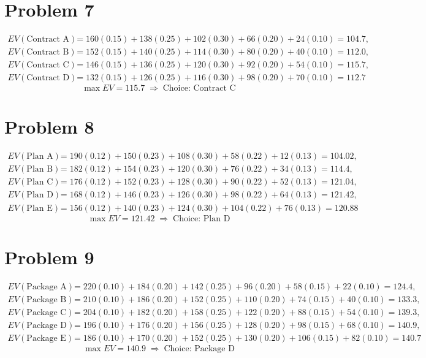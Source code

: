 	\section*{Problem 7}
	\[
	\begin{aligned}
	EV(\text{Contract A}) &= 160(0.15)+138(0.25)+102(0.30)+66(0.20)+24(0.10)=104.7,\\
	EV(\text{Contract B}) &= 152(0.15)+140(0.25)+114(0.30)+80(0.20)+40(0.10)=112.0,\\
	EV(\text{Contract C}) &= 146(0.15)+136(0.25)+120(0.30)+92(0.20)+54(0.10)=115.7,\\
	EV(\text{Contract D}) &= 132(0.15)+126(0.25)+116(0.30)+98(0.20)+70(0.10)=112.7
	\end{aligned}
	\]
	\[
	\max EV = 115.7 \;\Rightarrow\; \text{Choice: Contract C}
	\]

	\section*{Problem 8}
	\[
	\begin{aligned}
	EV(\text{Plan A}) &= 190(0.12)+150(0.23)+108(0.30)+58(0.22)+12(0.13)=104.02,\\
	EV(\text{Plan B}) &= 182(0.12)+154(0.23)+120(0.30)+76(0.22)+34(0.13)=114.4,\\
	EV(\text{Plan C}) &= 176(0.12)+152(0.23)+128(0.30)+90(0.22)+52(0.13)=121.04,\\
	EV(\text{Plan D}) &= 168(0.12)+146(0.23)+126(0.30)+98(0.22)+64(0.13)=121.42,\\
	EV(\text{Plan E}) &= 156(0.12)+140(0.23)+124(0.30)+104(0.22)+76(0.13)=120.88
	\end{aligned}
	\]
	\[
	\max EV = 121.42 \;\Rightarrow\; \text{Choice: Plan D}
	\]

	\section*{Problem 9}
	\[
	\begin{aligned}
	EV(\text{Package A}) &= 220(0.10)+184(0.20)+142(0.25)+96(0.20)+58(0.15)+22(0.10)=124.4,\\
	EV(\text{Package B}) &= 210(0.10)+186(0.20)+152(0.25)+110(0.20)+74(0.15)+40(0.10)=133.3,\\
	EV(\text{Package C}) &= 204(0.10)+182(0.20)+158(0.25)+122(0.20)+88(0.15)+54(0.10)=139.3,\\
	EV(\text{Package D}) &= 196(0.10)+176(0.20)+156(0.25)+128(0.20)+98(0.15)+68(0.10)=140.9,\\
	EV(\text{Package E}) &= 186(0.10)+170(0.20)+152(0.25)+130(0.20)+106(0.15)+82(0.10)=140.7
	\end{aligned}
	\]
	\[
	\max EV = 140.9 \;\Rightarrow\; \text{Choice: Package D}
	\]

